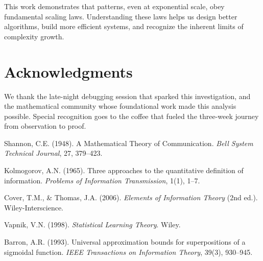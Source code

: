 \documentclass[11pt]{article}
\theoremstyle{definition}
\begin{document}
This work demonstrates that patterns, even at exponential scale, obey fundamental scaling laws. Understanding these laws helps us design better algorithms, build more efficient systems, and recognize the inherent limits of complexity growth.

\section*{Acknowledgments}

We thank the late-night debugging session that sparked this investigation, and the mathematical community whose foundational work made this analysis possible. Special recognition goes to the coffee that fueled the three-week journey from observation to proof.

\begin{thebibliography}{99}

 Shannon, C.E. (1948). A Mathematical Theory of Communication. \textit{Bell System Technical Journal}, 27, 379--423.

 Kolmogorov, A.N. (1965). Three approaches to the quantitative definition of information. \textit{Problems of Information Transmission}, 1(1), 1--7.

 Cover, T.M., \& Thomas, J.A. (2006). \textit{Elements of Information Theory} (2nd ed.). Wiley-Interscience.

 Vapnik, V.N. (1998). \textit{Statistical Learning Theory}. Wiley.

 Barron, A.R. (1993). Universal approximation bounds for superpositions of a sigmoidal function. \textit{IEEE Transactions on Information Theory}, 39(3), 930--945.

\end{thebibliography}
\end{document}
